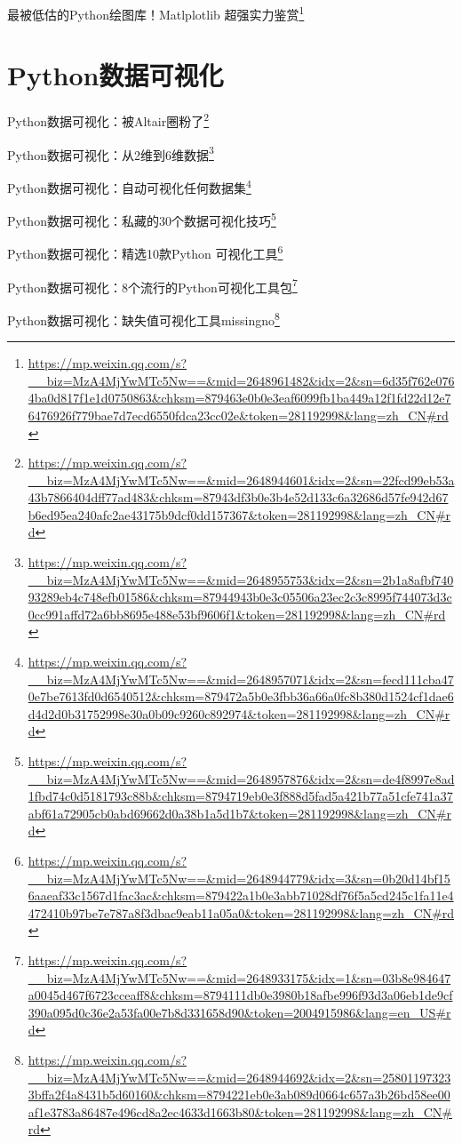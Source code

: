\documentclass[]{ctexbook}
\renewcommand{\href}[2]{#2\footnote{\url{#1}}}
\begin{document}
\href{https://mp.weixin.qq.com/s?__biz=MzA4MjYwMTc5Nw==\&mid=2648961482\&idx=2\&sn=6d35f762e0764ba0d817f1e1d0750863\&chksm=879463e0b0e3eaf6099fb1ba449a12f1fd22d12e76476926f779bae7d7ecd6550fdca23cc02e\&token=281192998\&lang=zh_CN\#rd}{最被低估的Python绘图库！Matlplotlib 超强实力鉴赏}

\hypertarget{pythonux6570ux636eux53efux89c6ux5316}{%
\section{Python数据可视化}\label{pythonux6570ux636eux53efux89c6ux5316}}

\href{https://mp.weixin.qq.com/s?__biz=MzA4MjYwMTc5Nw==\&mid=2648944601\&idx=2\&sn=22fcd99eb53a43b7866404dff77ad483\&chksm=87943df3b0e3b4e52d133c6a32686d57fe942d67b6ed95ea240afc2ae43175b9dcf0dd157367\&token=281192998\&lang=zh_CN\#rd}{Python数据可视化：被Altair圈粉了}

\href{https://mp.weixin.qq.com/s?__biz=MzA4MjYwMTc5Nw==\&mid=2648955753\&idx=2\&sn=2b1a8afbf74093289eb4c748efb01586\&chksm=87944943b0e3c05506a23ec2c3c8995f744073d3c0cc991affd72a6bb8695e488e53bf9606f1\&token=281192998\&lang=zh_CN\#rd}{Python数据可视化：从2维到6维数据}

\href{https://mp.weixin.qq.com/s?__biz=MzA4MjYwMTc5Nw==\&mid=2648957071\&idx=2\&sn=fecd111cba470e7be7613fd0d6540512\&chksm=879472a5b0e3fbb36a66a0fc8b380d1524cf1dae6d4d2d0b31752998e30a0b09c9260c892974\&token=281192998\&lang=zh_CN\#rd}{Python数据可视化：自动可视化任何数据集}

\href{https://mp.weixin.qq.com/s?__biz=MzA4MjYwMTc5Nw==\&mid=2648957876\&idx=2\&sn=de4f8997e8ad1fbd74c0d5181793c88b\&chksm=8794719eb0e3f888d5fad5a421b77a51cfe741a37abf61a72905cb0abd69662d0a38b1a5d1b7\&token=281192998\&lang=zh_CN\#rd}{Python数据可视化：私藏的30个数据可视化技巧}

\href{https://mp.weixin.qq.com/s?__biz=MzA4MjYwMTc5Nw==\&mid=2648944779\&idx=3\&sn=0b20d14bf156aaeaf33c1567d1fac3ac\&chksm=879422a1b0e3abb71028df76f5a5cd245c1fa11e4472410b97be7e787a8f3dbac9eab11a05a0\&token=281192998\&lang=zh_CN\#rd}{Python数据可视化：精选10款Python 可视化工具}

\href{https://mp.weixin.qq.com/s?__biz=MzA4MjYwMTc5Nw==\&mid=2648933175\&idx=1\&sn=03b8e984647a0045d467f6723cceaff8\&chksm=8794111db0e3980b18afbe996f93d3a06eb1de9cf390a095d0c36e2a53fa00e7b8d331658d90\&token=2004915986\&lang=en_US\#rd}{Python数据可视化：8个流行的Python可视化工具包}

\href{https://mp.weixin.qq.com/s?__biz=MzA4MjYwMTc5Nw==\&mid=2648944692\&idx=2\&sn=258011973233bffa2f4a8431b5d60160\&chksm=8794221eb0e3ab089d0664c657a3b26bd58ee00af1e3783a86487e496cd8a2ec4633d1663b80\&token=281192998\&lang=zh_CN\#rd}{Python数据可视化：缺失值可视化工具missingno}
\end{document}

